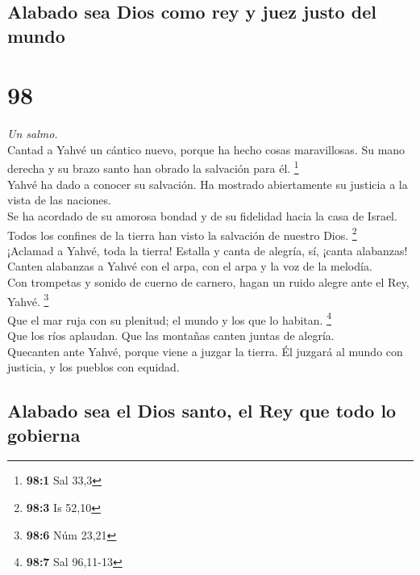 \hypertarget{alabado-sea-dios-como-rey-y-juez-justo-del-mundo}{%
\subsection{Alabado sea Dios como rey y juez justo del
mundo}\label{alabado-sea-dios-como-rey-y-juez-justo-del-mundo}}

\hypertarget{section-95}{%
\section{98}\label{section-95}}

\emph{Un salmo.}\\
 Cantad a Yahvé un cántico nuevo, porque ha hecho cosas
maravillosas. Su mano derecha y su brazo santo han obrado la salvación
para él. \footnote{\textbf{98:1} Sal 33,3}\\
 Yahvé ha dado a conocer su salvación. Ha mostrado
abiertamente su justicia a la vista de las naciones.\\
 Se ha acordado de su amorosa bondad y de su fidelidad
hacia la casa de Israel. Todos los confines de la tierra han visto la
salvación de nuestro Dios. \footnote{\textbf{98:3} Is 52,10}\\
 ¡Aclamad a Yahvé, toda la tierra! Estalla y canta de
alegría, sí, ¡canta alabanzas!\\
 Canten alabanzas a Yahvé con el arpa, con el arpa y la
voz de la melodía.\\
 Con trompetas y sonido de cuerno de carnero, hagan un
ruido alegre ante el Rey, Yahvé. \footnote{\textbf{98:6} Núm 23,21}\\
 Que el mar ruja con su plenitud; el mundo y los que lo
habitan. \footnote{\textbf{98:7} Sal 96,11-13}\\
 Que los ríos aplaudan. Que las montañas canten juntas de
alegría.\\
 Quecanten ante Yahvé, porque viene a juzgar la tierra. Él
juzgará al mundo con justicia, y los pueblos con equidad.

\hypertarget{alabado-sea-el-dios-santo-el-rey-que-todo-lo-gobierna}{%
\subsection{Alabado sea el Dios santo, el Rey que todo lo
gobierna}\label{alabado-sea-el-dios-santo-el-rey-que-todo-lo-gobierna}}

